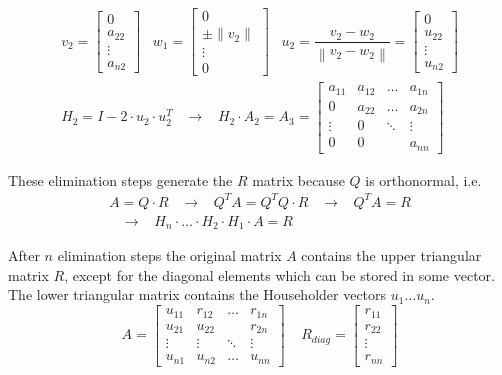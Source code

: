 \begin{equation}
\begin{split}
v_2 =
\begin{bmatrix}
0\\
a_{22}\\
\vdots\\
a_{n2}
\end{bmatrix}
\;\;\;
w_1 =
\begin{bmatrix}
0\\
\pm\lVert v_2 \rVert\\
\vdots\\
0
\end{bmatrix}
\;\;\;
u_2 = \dfrac{v_2 - w_2}{\left\lVert v_2 - w_2\right\rVert} =
\begin{bmatrix}
0\\
u_{22}\\
\vdots\\
u_{n2}
\end{bmatrix}
\\
H_2 = I - 2 \cdot u_2 \cdot u_2^T
\;\;\; \rightarrow \;\;\;
H_2 \cdot A_2 = A_3 =
\begin{bmatrix}
a_{11} & a_{12} & \ldots & a_{1n}\\
0 & a_{22} & \ldots & a_{2n}\\
\vdots & 0 & \ddots & \vdots\\
0 & 0 &  & a_{nn}
\end{bmatrix}
\end{split}
\end{equation}

These elimination steps generate the $R$ matrix because $Q$ is
orthonormal, i.e.
\begin{equation}
\begin{split}
A = Q\cdot R
\;\;\; \rightarrow \;\;\;
Q^T A = Q^T Q\cdot R
\;\;\; \rightarrow \;\;\;
Q^T A = R
\\
\;\;\; \rightarrow \;\;\;
H_n \cdot \ldots \cdot H_2 \cdot H_1 \cdot A = R
\end{split}
\end{equation}

\addvspace{12pt}

After $n$ elimination steps the original matrix $A$ contains the upper
triangular matrix $R$, except for the diagonal elements which can be
stored in some vector.  The lower triangular matrix contains the
Householder vectors $u_1 \ldots u_n$.
\begin{equation}
A =
\begin{bmatrix}
u_{11} & r_{12} & \ldots & r_{1n}\\
u_{21} & u_{22} &  & r_{2n}\\
\vdots & \vdots & \ddots & \vdots\\
u_{n1} & u_{n2} & \ldots & u_{nn}
\end{bmatrix}
\;\;\;\;
R_{diag} = 
\begin{bmatrix}
r_{11}\\
r_{22}\\
\vdots\\
r_{nn}
\end{bmatrix}
\end{equation}

